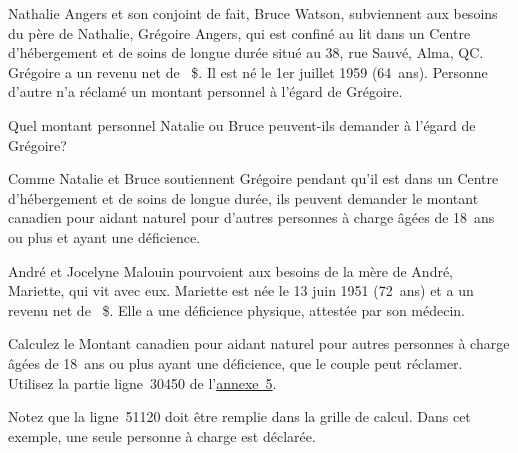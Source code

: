 \begin{question}
	Nathalie Angers et son conjoint de fait, Bruce Watson, subviennent aux besoins du père de Nathalie, Grégoire Angers, qui est confiné au lit dans un Centre d'hébergement et de soins de longue durée situé au 38, rue Sauvé, Alma, QC. Grégoire a un revenu net de ~\$. Il est né le 1er juillet 1959 (64~ans). Personne d'autre n'a réclamé un montant personnel à l'égard de Grégoire.
	
	Quel montant personnel Natalie ou Bruce peuvent-ils demander à l'égard de Grégoire?
\end{question}
Comme Natalie et Bruce soutiennent Grégoire pendant qu'il est dans un Centre d'hébergement et de soins de longue durée, ils peuvent demander le montant canadien pour aidant naturel pour d'autres personnes à charge âgées de 18~ans ou plus et ayant une déficience.

\begin{question}
	André et Jocelyne Malouin pourvoient aux besoins de la mère de André, Mariette, qui vit avec eux. Mariette est née le 13 juin 1951 (72~ans) et a un revenu net de ~\$. Elle a une déficience physique, attestée par son médecin.
\end{question}
\setcounter{sousQuestion}{0}
\begin{sousQuestion}
	Calculez le Montant canadien pour aidant naturel pour autres personnes à charge âgées de 18~ans ou plus ayant une déficience, que le couple peut réclamer. Utilisez la partie \og ligne~30450 \fg{} de l'\href{https://www.canada.ca/fr/agence-revenu/services/formulaires-publications/trousses-impot-toutes-annees-imposition/trousse-generale-impot-prestations/5000-s5.html}{annexe~5}.
\end{sousQuestion}
Notez que la ligne~51120 doit être remplie dans la grille de calcul. Dans cet exemple, une seule personne à charge est déclarée.

